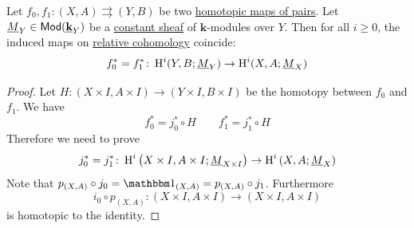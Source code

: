 \documentclass[../../main]{subfiles}
\begin{document}
\begin{theorem}[Homotopy]\label{thm:homotopy-pairs}
  Let \(f_{0}, f_{1}\colon (X, A) \rightrightarrows (Y, B)\) be two \hyperref[def:homotopy-over]{homotopic maps of pairs}.
  Let \(\underline{M}_{Y} \in \mathsf{Mod}( \underline{\mathbf{k}}_{Y} )\) be a \hyperref[def:constant-sheaf]{constant sheaf} of \(\mathbf{k}\)-modules over \(Y\).
  Then for all \(i \geq 0\), the induced maps on \hyperref[def:relative-sheaf-cohomology]{relative cohomology} coincide:
  \begin{equation*}
    f_{0}^{\ast} = f_{1}^{\ast} \colon \operatorname{H}^{i}(Y, B; \underline{M}_{Y}) \to \operatorname{H}^{i}(X, A; \underline{M}_{X})
  \end{equation*}
\end{theorem}
\begin{proof}
  Let \(H\colon (X \times I, A \times I) \to (Y \times I, B \times I)\) be the homotopy between \(f_{0}\) and \(f_{1}\).
  We have
  \begin{equation*}
    f_{0}^{\ast} = j_{0}^{\ast} \circ H \qquad f_{1}^{\ast} = j_{1}^{\ast} \circ H
  \end{equation*}
  Therefore we need to prove
  \begin{equation*}
    j_{0}^{\ast} = j_{1}^{\ast}\colon \operatorname{H}^{i} \left( X \times I, A \times I; \underline{M}_{X \times I} \right) \to \operatorname{H}^{i} \left( X, A; \underline{M}_{X} \right)
  \end{equation*}
  Note that \(p_{(X, A)} \circ j_{0} = \id_{(X, A)} = p_{(X, A)} \circ j_{1}\).
  Furthermore
  \begin{equation*}
    i_{0} \circ p_{(X, A)}\colon (X \times I, A \times I) \to (X \times I, A \times I)
  \end{equation*}
  is homotopic to the identity.


\end{proof}
\end{document}
